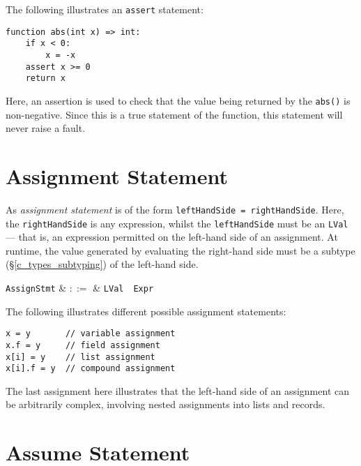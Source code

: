 \noindent The following illustrates an \lstinline{assert} statement:
\begin{lstlisting}
function abs(int x) => int:
    if x < 0:
        x = -x
    assert x >= 0
    return x
\end{lstlisting}
Here, an assertion is used to check that the value being returned by the \lstinline{abs()} is non-negative.  Since this is a true statement of the function, this statement will never raise a fault.


\section{Assignment Statement}

As {\em assignment statement} is of the form \lstinline{leftHandSide = rightHandSide}.  Here, the \lstinline{rightHandSide} is any expression, whilst the \lstinline{leftHandSide} must be an \lstinline{LVal} --- that is, an expression permitted on the left-hand side of an assignment.  At runtime, the value generated by evaluating the right-hand side must be a subtype (\S\ref{c_types_subtyping}) of the left-hand side.

\begin{syntax}
  \verb+AssignStmt+ & $::=$ & \verb+LVal+\ \token{=}\ \verb+Expr+\\
\end{syntax}


\noindent The following illustrates different possible assignment statements:
\begin{lstlisting}
x = y       // variable assignment
x.f = y     // field assignment
x[i] = y    // list assignment
x[i].f = y  // compound assignment
\end{lstlisting}
The last assignment here illustrates that the left-hand side of an assignment can be arbitrarily complex, involving nested assignments into lists and records.


\section{Assume Statement}

